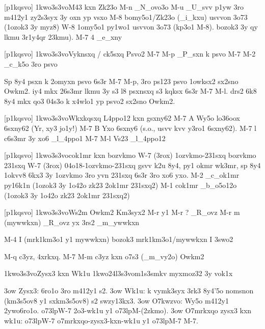 [p1kqsvo] \p1kwo3s3vo{M43 kxn Zk23o}
M-n    _N_ovo3o
M-u    _U_svv p1yw 3ro m412y1 zy2s3syx 3y
       oxn yp vsxo
M-8    bomy5o1/Zk23o (_i_kxu) usvvon 3o73 
       (1ozok3 3y myz8) 
W-8    1omy5o1 py1wo1 usvvon 3o73 (kp3o1 M-8).
       bozok3 3y qy lkmu 3r1y4qr 23kmu).
M-7 4  _e_xny


[p1kqsvo] \p1kwo3s3vo{Vyknsxq / ck5sxq Psvo2}
M-7 M-p  _P_sxn k psvo
M-7 M-2  _c_k5o 3ro psvo

Sp 8y4 psxn k 2omyxn psvo 6s3r M-7 M-p, 
3ro ps123 psvo 1owksx2 sx2sno Owkm2.  
iy4 mkx 26s3mr lkmu 3y s3 l8 psxnsxq s3 
kqksx 6s3r M-7 M-l.  drs2 6k8 8y4 mkx qo3 
04s3o k x4wlo1 yp psvo2 sx2sno Owkm2.


[p1kqsvo] \p1kwo3s3vo{Wkxkqsxq L4ppo12 kxn gsxny62}
M-7 A      Wy5o lo36oox 6sxny62  
           (Yr, xy3 jo1y!)
M-7 B      Yxo 6sxny6 
           (s.o., usvv kvv y3ro1 6sxny62).
M-7 l      c6s3mr 3y xo6 _l_4ppo1
M-7 M-l    Vs23 _l_4ppo12


[p1kqsvo] \p1kwo3s3vo{cok1mr kxn bozvkmo}
W-7 (3rox) 1ozvkmo-231sxq
           bozvkmo 231sxq
W-7 (3rox) 04o18-1ozvkmo-231sxq
           gsvv k2u 8y4, py1 okmr wk3mr,
           sp 8y4 1okvv8 6kx3 3y 1ozvkmo
           3ro yvn 231sxq 6s3r 3ro xo6 yxo.
M-2        _c_ok1mr py16k1n (1ozok3 3y
           1o42o zk23 2ok1mr 231sxq2)
M-1        cok1mr _b_o5o12o (1ozok3 3y
           1o42o zk23 2ok1mr 231sxq2)

                     
[p1kqsvo] \p1kwo3s3vo{Ws2m Owkm2 Km3syx2}
M-r y1 M-r ?    _R_ovz
M-r m (mywwkxn) _R_ovz yx 3rs2 _m_ywwkxn

M-4 I (mrk1km3o1 y1 mywwkxn)   
             bozok3 mrk1km3o1/mywwkxn I 3swo2

M-q          c3yz, 4xrkxq.
M-7 M-m      c3yz kxn o7s3 (_m_vy2o) Owkm2  


  \p1kwo3s3vo{Zysx3 kxn Wk1u}
  \p1kwo24l3s3vo{m1s3smkv myxmoz32 3y vok1x}

  \s3ow Zysx3:  6ro1o 3ro m412y1 s2.
  \s3ow Wk1u: k vymk3syx 3rk3 8y4'5o nomsnon (km3s5ov8 y1 sxkm3s5ov8)
    s2 swzy13kx3.
  \s3ow O7kwzvo:   Wy5o m412y1 2ywo6ro1o.  \3o73lp{W-7 2o3-wk1u} y1
    \3o73lp{M-(2zkmo)}.
  \s3ow O7mrkxqo zysx3 kxn wk1u:   \3o73lp{W-7
      o7mrkxqo-zysx3-kxn-wk1u} y1 \3o73lp{M-7 M-7}.

